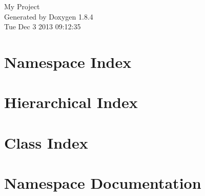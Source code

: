 \documentclass[twoside]{book}
\newcommand{\clearemptydoublepage}{%
  \newpage{\pagestyle{empty}\cleardoublepage}%
}
\begin{document}
\hypersetup{pageanchor=false}
\begin{titlepage}
\vspace*{7cm}
\begin{center}%
{\Large My Project }\\
\vspace*{1cm}
{\large Generated by Doxygen 1.8.4}\\
\vspace*{0.5cm}
{\small Tue Dec 3 2013 09:12:35}\\
\end{center}
\end{titlepage}
\clearemptydoublepage
\tableofcontents
\clearemptydoublepage
{}
\hypersetup{pageanchor=true}

\chapter{Namespace Index}

\chapter{Hierarchical Index}

\chapter{Class Index}

\chapter{Namespace Documentation}












\end{document}
